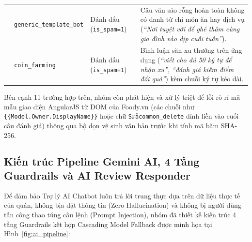 \documentclass[12pt, a4paper]{article}
\begin{document}
\begin{table}[H]
\begin{tabularx}{\textwidth}{c l l X}
\addlinespace
10 & \texttt{generic\_template\_bot} & Đánh dấu (\texttt{is\_spam=1}) & Câu văn sáo rỗng hoàn toàn không có danh từ chỉ món ăn hay dịch vụ (\textit{``Nơi tuyệt vời để ghé thăm cùng gia đình vào dịp cuối tuần''}). \\
\addlinespace
11 & \texttt{coin\_farming} & Đánh dấu (\texttt{is\_spam=1}) & Bình luận săn xu thưởng trên ứng dụng (\textit{``viết cho đủ 50 ký tự để nhận xu'', ``đánh giá kiếm điểm đổi quà''}) kèm chuỗi ký tự kéo dài. \\
\bottomrule
\end{tabularx}
\end{table}

Bên cạnh 11 trường hợp trên, nhóm còn phát hiện và xử lý triệt để lỗi rò rỉ mã mẫu giao diện AngularJS từ DOM của Foody.vn (các chuỗi như \texttt{\{\{Model.Owner.DisplayName\}\}} hoặc chữ \texttt{Sửacommon\_delete} dính liền vào cuối câu đánh giá) thông qua bộ dọn vệ sinh văn bản trước khi tính mã băm SHA-256.

\newpage
\subsection{Kiến trúc Pipeline Gemini AI, 4 Tầng Guardrails và AI Review Responder}
Để đảm bảo Trợ lý AI Chatbot luôn trả lời trung thực dựa trên dữ liệu thực tế của quán, không bịa đặt thông tin (Zero Hallucination) và không bị người dùng tấn công thao túng câu lệnh (Prompt Injection), nhóm đã thiết kế kiến trúc 4 tầng Guardrails kết hợp Cascading Model Fallback được minh họa tại Hình~\ref{fig:ai_pipeline}:
\end{document}
